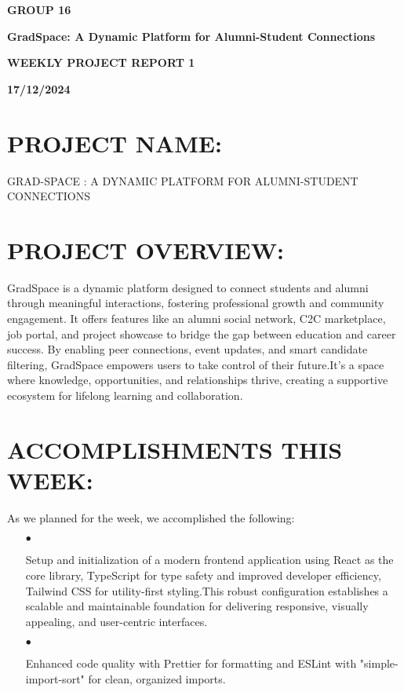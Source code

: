 \documentclass[12pt]{article}
\renewcommand{\maketitle}{
	\begin{center}
			{\fontsize{16}{19.2}\selectfont \textbf{GROUP 16} \par}
		\vspace{10pt}
		{\fontsize{16}{19.2}\selectfont \textbf{GradSpace: A Dynamic Platform for Alumni-Student Connections} \par}
		\vspace{10pt}
		{\fontsize{14}{16.8}\selectfont \textbf{WEEKLY PROJECT REPORT 1} \par}
		\vspace{7pt}
		{\fontsize{14}{14.4}\selectfont \textbf{17/12/2024} \par}
	\end{center}
}
\begin{document}
	
	\title{}
	\author{}
	\date{}
	\maketitle
	
	\section*{\fontsize{14}{14.4}\selectfont \textbf{PROJECT NAME:}}
	
	GRAD-SPACE : A DYNAMIC PLATFORM FOR ALUMNI-STUDENT CONNECTIONS
	
	\section*{\fontsize{14}{14.4}\selectfont \textbf{PROJECT OVERVIEW:}}
	
GradSpace is a dynamic platform designed to connect students and alumni through meaningful interactions, fostering professional growth and community engagement. It offers features like an alumni social network, C2C marketplace, job portal, and project showcase to bridge the gap between education and career success. By enabling peer connections, event updates, and smart candidate filtering, GradSpace empowers users to take control of their future.It’s a space where knowledge, opportunities, and relationships thrive, creating a supportive ecosystem for lifelong learning and collaboration.
	
	\section*{\fontsize{14}{14.4}\selectfont \textbf{ACCOMPLISHMENTS THIS WEEK:}}
	
	As we planned for the week, we accomplished the following:
	
	\begin{itemize}
		\item[$\bullet$]
		
	    Setup and initialization of a modern frontend application using React as the core library, TypeScript for type safety and improved developer efficiency, Tailwind CSS for utility-first styling.This robust configuration establishes a scalable and maintainable foundation for delivering responsive, visually appealing, and user-centric interfaces.
		\item[$\bullet$]
		
	 Enhanced code quality with Prettier for formatting and ESLint with "simple-import-sort" for clean, organized imports.
	\end{itemize}
	
\end{document}
